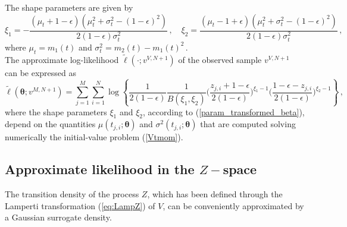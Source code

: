 \documentclass[11pt]{article}
\theoremstyle{definition}
\begin{document}
The shape parameters are given by
\begin{equation}
\xi_1 = - \frac{(\mu_t + 1 - \epsilon)(\mu_t^2 + \sigma_t^2 - (1- \epsilon)^2)}{2 (1 - \epsilon) \sigma_t^2}\,, \quad \xi_2=  \frac{(\mu_t-1 + \epsilon )(\mu_t^2 + \sigma_t^2 - (1- \epsilon)^2)}{2 (1 - \epsilon) \sigma_t^2} \,, \label{param_transformed_beta}
\end{equation}
where $\mu_t = m_1 (t)$ and $\sigma_t^2= m_2 (t)- m_1 (t)^2\,.$ \\

The approximate log-likelihood $\tilde{\ell}(\cdot ; v^{V, N+1})$ of the observed sample $v^{V, N+1}$ can be expressed as 
\begin{equation}
 \tilde{\ell} (\bm{\theta}; v^{M,N +1}) = \sum_{j=1}^M \sum_{i=1}^N \log  \left\{ \frac{1}{2(1 - \epsilon)} \frac{1}{B(\xi_1, \xi_2)} \Big( \frac{z_{j,i} + 1 - \epsilon}{2(1 - \epsilon)} \Big)^{\xi_1 -1}  \Big( \frac{1 - \epsilon - z_{j,i}}{2(1 - \epsilon)} \Big)^{\xi_2 -1} \right\} \,,
\label{loglikelihoodV}
\end{equation}
where the shape parameters $\xi_1$ and $\xi_2$, according to (\ref{param_transformed_beta}), depend on the quantities $\mu(t_{j,i};\bm{\theta} )$ and $\sigma^2(t_{j,i};\bm{\theta} )$ that are computed solving numerically the initial-value problem (\ref{Vtmom}). \\


\subsection{Approximate likelihood  in the $Z-$space}

The transition density of the process $Z$, which has been defined through the Lamperti transformation (\ref{eq:LampZ}) of $V$, can be conveniently approximated by a Gaussian surrogate density. 
\end{document}

